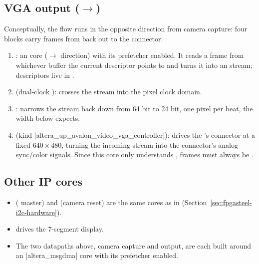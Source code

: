 \subsection{VGA output ($\rightarrow$)}
\label{subsec:fpgasteel-simple-forwarding-vga-output}

Conceptually, the flow runs in the opposite direction from camera capture: four blocks carry frames from  back out to the  connector.

\begin{enumerate}
    \item \textbf{}: an  core ($\rightarrow$ direction) with its prefetcher enabled. It reads a frame from whichever  buffer the current descriptor points to and turns it into an  stream; descriptors live in .
    \item \textbf{} (dual-clock ): crosses the stream into the  pixel clock domain.
    \item \textbf{}: narrows the stream back down from 64 bit to 24 bit, one  pixel per beat, the width  below expects.
    \item \textbf{} (kind |altera_up_avalon_video_vga_controller|): drives the 's  connector at a fixed $640\times480$, turning the incoming  stream into the connector's analog sync/color signals. Since this core only understands ,  frames must always be .
\end{enumerate}

\subsection{Other IP cores}
\label{subsec:fpgasteel-simple-forwarding-other-ip}

\begin{itemize}
    \item \textbf{} ( master) and \textbf{} (camera reset) are the same cores as in  (Section~\ref{sec:fpgasteel-i2c-hardware}).
    \item \textbf{} drives the 7-segment display.
    \item The two datapaths above, camera capture and  output, are each built around an |altera_msgdma| core with its prefetcher enabled.
\end{itemize}

